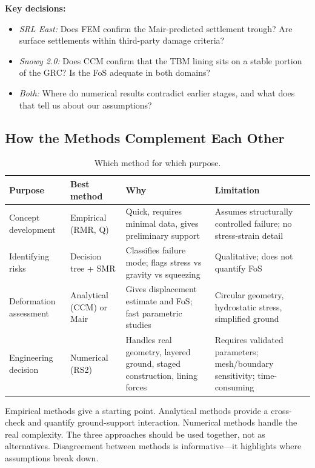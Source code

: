 \documentclass[a4paper,12pt]{article}
\begin{document}
\textbf{Key decisions:}
\begin{itemize}[nosep]
    \item \textit{SRL East:} Does FEM confirm the Mair-predicted settlement trough? Are surface settlements within third-party damage criteria?
    \item \textit{Snowy 2.0:} Does CCM confirm that the TBM lining sits on a stable portion of the GRC? Is the FoS adequate in both domains?
    \item \textit{Both:} Where do numerical results contradict earlier stages, and what does that tell us about our assumptions?
\end{itemize}

\subsection{How the Methods Complement Each Other}

\begin{table}[h!]
\centering
\small
\begin{tabularx}{\textwidth}{l X X X}
\toprule
\textbf{Purpose} & \textbf{Best method} & \textbf{Why} & \textbf{Limitation} \\
\midrule
Concept development & Empirical (RMR, Q) & Quick, requires minimal data, gives preliminary support & Assumes structurally controlled failure; no stress-strain detail \\
Identifying risks & Decision tree + SMR & Classifies failure mode; flags stress vs gravity vs squeezing & Qualitative; does not quantify FoS \\
Deformation assessment & Analytical (CCM) or Mair & Gives displacement estimate and FoS; fast parametric studies & Circular geometry, hydrostatic stress, simplified ground \\
Engineering decision & Numerical (RS2) & Handles real geometry, layered ground, staged construction, lining forces & Requires validated parameters; mesh/boundary sensitivity; time-consuming \\
\bottomrule
\end{tabularx}
\caption{Which method for which purpose.}
\end{table}

\begin{notebox}
Empirical methods give a starting point. Analytical methods provide a cross-check and quantify ground-support interaction. Numerical methods handle the real complexity. The three approaches should be used together, not as alternatives. Disagreement between methods is informative---it highlights where assumptions break down.
\end{notebox}
\end{document}
